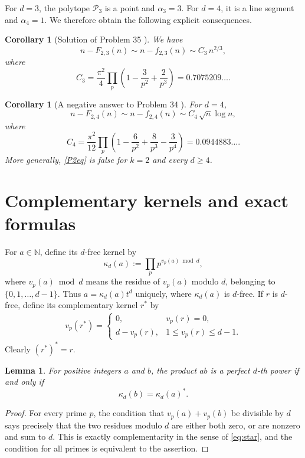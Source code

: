 \documentclass[12pt,a4paper,reqno]{amsart}
\numberwithin{equation}{section}
\newcommand{\cP}{\mathcal P}
\newcommand{\1}{\mathbf 1}
\theoremstyle{plain}
\newtheorem{lemma}[theorem]{Lemma}
\newtheorem{corollary}[theorem]{Corollary}
\theoremstyle{definition}
\begin{document}
For $d=3$, the polytope $\cP_3$ is a point and $\alpha_3=3$.
For $d=4$, it is a line segment and $\alpha_4=1$.  We therefore obtain
the following explicit consequences.

\begin{corollary}[Solution of Problem 35 \cite{FJKPS}]\label{cor:d3}
We have
\[
 n-F_{2,3}(n)\sim n-f_{2,3}(n)\sim C_3\,n^{2/3},
\]
where
\[
 C_3=\frac{\pi^2}{4}
 \prod_p\left(1-\frac3{p^2}+\frac2{p^3}\right)
 =0.7075209\ldots.
\]
\end{corollary}

\begin{corollary}[A negative answer to Problem 34 \cite{FJKPS}]\label{cor:d4}
For $d=4$,
\[
 n-F_{2,4}(n)\sim n-f_{2,4}(n)
 \sim C_4\,\sqrt n\log n,
\]
where
\[
 C_4=\frac{\pi^2}{12}
 \prod_p\left(1-\frac6{p^2}+\frac8{p^3}-\frac3{p^4}\right)
 =0.0944883\ldots.
\]
More generally, \eqref{P2eq} is false for $k=2$ and every
$d\geq4$.
\end{corollary}

\section{Complementary kernels and exact formulas}

For $a\in\mathbb{N}$, define its $d$-free kernel by
\[
 \kappa_d(a):=\prod_p p^{v_p(a)\bmod d},
\]
where $v_p(a)\bmod d$ means the residue of $v_p(a)$ modulo $d$, belonging to $\{0,1,\ldots,d-1\}$.
Thus $a=\kappa_d(a)t^d$ uniquely, where $\kappa_d(a)$ is $d$-free.
If $r$ is $d$-free, define its complementary kernel $r^*$ by
\begin{align}
 v_p(r^*)=
 \begin{cases}
 0,&v_p(r)=0,\\
 d-v_p(r),&1\leq v_p(r)\leq d-1.
 \end{cases}
\label{eq:star}
\end{align}
Clearly $(r^*)^*=r$.

\begin{lemma}\label{lem:kernelcriterion}
For positive integers $a$ and $b$, the product $ab$ is a perfect
$d$-th power if and only if
\[
 \kappa_d(b)=\kappa_d(a)^*.
\]
\end{lemma}

\begin{proof}
For every prime $p$, the condition that $v_p(a)+v_p(b)$ be divisible
by $d$ says precisely that the two residues modulo $d$ are either both
zero, or are nonzero and sum to $d$.  This is exactly complementarity
in the sense of \eqref{eq:star}, and the condition for all primes is
equivalent to the assertion.
\end{proof}
\end{document}
